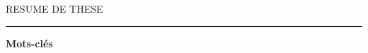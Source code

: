 
\begin{center}
\MakeUppercase{\LARGE{R}\Large{esume de these}} \\
\vspace{0mm}
\noindent\rule{17cm}{0.4pt}
\end{center}

\large{\textbf{Mots-clés}}
